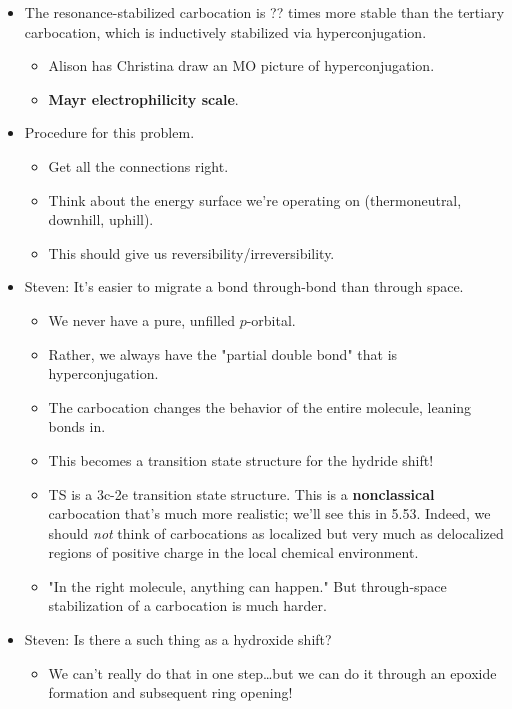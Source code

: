\documentclass[../notes.tex]{subfiles}
\begin{document}
\begin{itemize}
\begin{itemize}
    \end{itemize}
    \item The resonance-stabilized carbocation is ?? times more stable than the tertiary carbocation, which is inductively stabilized via hyperconjugation.
    \begin{itemize}
        \item Alison has Christina draw an MO picture of hyperconjugation.
        \item \textbf{Mayr electrophilicity scale}.
    \end{itemize}
    \item Procedure for this problem.
    \begin{itemize}
        \item Get all the connections right.
        \item Think about the energy surface we're operating on (thermoneutral, downhill, uphill).
        \item This should give us reversibility/irreversibility.
    \end{itemize}
    \item Steven: It's easier to migrate a bond through-bond than through space.
    \begin{itemize}
        \item We never have a pure, unfilled $p$-orbital.
        \item Rather, we always have the "partial double bond" that is hyperconjugation.
        \item The carbocation changes the behavior of the entire molecule, leaning bonds in.
        \item This becomes a transition state structure for the hydride shift!
        \item TS is a 3c-2e transition state structure. This is a \textbf{nonclassical} carbocation that's much more realistic; we'll see this in 5.53. Indeed, we should \emph{not} think of carbocations as localized but very much as delocalized regions of positive charge in the local chemical environment.
        \item "In the right molecule, anything can happen." But through-space stabilization of a carbocation is much harder.
    \end{itemize}
    \item Steven: Is there a such thing as a hydroxide shift?
    \begin{itemize}
        \item We can't really do that in one step\dots but we can do it through an epoxide formation and subsequent ring opening!

\end{itemize}
\end{itemize}
\end{document}
